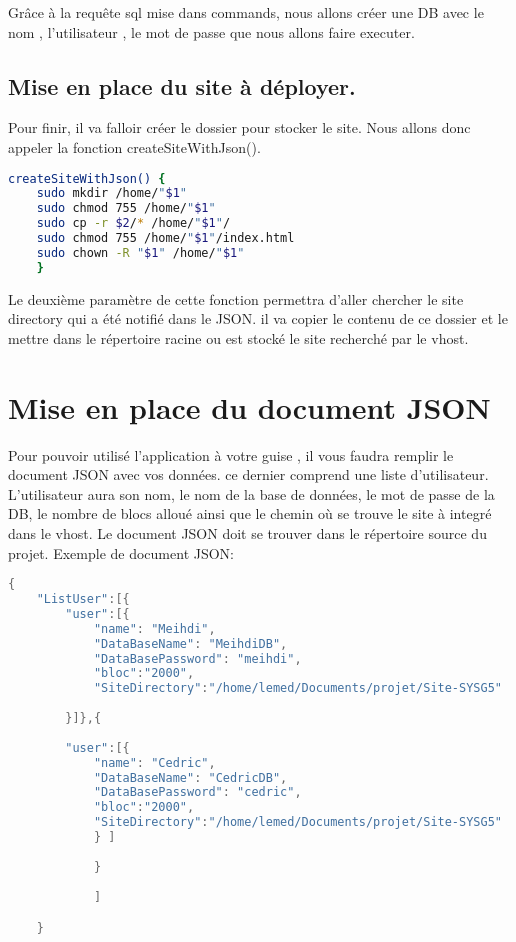 \documentclass{article}
\begin{document}
 	 Grâce à la requête sql mise dans commands, nous allons créer une DB avec le nom , l'utilisateur , le mot de passe que nous allons faire executer. 

\subsection{Mise en place du site à déployer.}

	Pour finir, il va falloir créer le dossier pour stocker le site. Nous allons donc appeler la fonction createSiteWithJson().

\begin{lstlisting}[language=bash]
    createSiteWithJson() {
	sudo mkdir /home/"$1"
	sudo chmod 755 /home/"$1"
	sudo cp -r $2/* /home/"$1"/
	sudo chmod 755 /home/"$1"/index.html
	sudo chown -R "$1" /home/"$1"
	}
	\end{lstlisting}

	Le deuxième paramètre de cette fonction permettra d'aller chercher le site directory qui a été notifié dans le JSON. il va copier le contenu de ce dossier
	et le mettre dans le répertoire racine ou est stocké le site recherché par le vhost.


\section{Mise en place du document JSON}

	Pour pouvoir utilisé l'application à votre guise , il vous faudra remplir le document JSON avec vos données. ce dernier comprend une liste 
	d'utilisateur. L'utilisateur aura son nom, le nom de la base de données, le mot de passe de la DB, le nombre de blocs alloué ainsi que le
	chemin où se trouve le site à integré dans le vhost. Le document JSON doit se trouver dans le répertoire source du projet.
	Exemple de document JSON:

	\begin{lstlisting}[language=java]
	{
    "ListUser":[{
        "user":[{
            "name": "Meihdi",
            "DataBaseName": "MeihdiDB",
            "DataBasePassword": "meihdi",
            "bloc":"2000",
            "SiteDirectory":"/home/lemed/Documents/projet/Site-SYSG5"
           
        }]},{
        
        "user":[{
            "name": "Cedric",
            "DataBaseName": "CedricDB",
            "DataBasePassword": "cedric",
            "bloc":"2000",
            "SiteDirectory":"/home/lemed/Documents/projet/Site-SYSG5"
       	 	} ]  
        	
      		}
    
    		]

	}
	\end{lstlisting}
\end{document}
